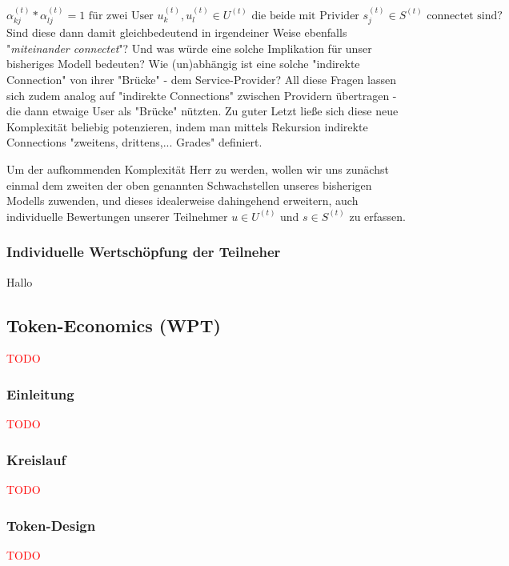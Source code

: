 \documentclass[11pt]{scrartcl}
\newcommand\todo[1]{\textcolor{red}{#1}}
\begin{document}
\begin{equation*}
  \alpha^{(t)}_{kj} * \alpha^{(t)}_{lj} = 1 \textrm{ für zwei User } u^{(t)}_k, u^{(t)}_l \in U^{(t)} \textrm{ die beide mit Privider } s^{(t)}_j \in S^{(t)} \textrm{ connectet sind?}
\end{equation*}
Sind diese dann damit gleichbedeutend in irgendeiner Weise ebenfalls "\textit{miteinander connectet}"? Und was würde eine solche Implikation für unser bisheriges Modell bedeuten? Wie (un)abhängig ist eine solche "indirekte Connection" von ihrer "Brücke" - dem Service-Provider? All diese Fragen lassen sich zudem analog auf "indirekte Connections" zwischen Providern übertragen - die dann etwaige User als "Brücke" nützten. Zu guter Letzt ließe sich diese neue Komplexität beliebig potenzieren, indem man mittels Rekursion indirekte Connections "zweitens, drittens,... Grades" definiert.

Um der aufkommenden Komplexität Herr zu werden, wollen wir uns zunächst einmal dem zweiten der oben genannten Schwachstellen unseres bisherigen Modells zuwenden, und dieses idealerweise dahingehend erweitern, auch individuelle Bewertungen unserer Teilnehmer $u \in U^{(t)}$ und $s \in S^{(t)}$ zu erfassen.


\subsubsection{Individuelle Wertschöpfung der Teilneher}
\label{sec:eco_zahlen_teilnehmer}

Hallo




\subsection{Token-Economics (WPT)}
\label{sec:eco_wpt}
\todo{TODO}

\subsubsection{Einleitung}
\label{sec:wpt_einleitung}
\todo{TODO}

\subsubsection{Kreislauf}
\label{sec:wpt_kreislauf}
\todo{TODO}

\subsubsection{Token-Design}
\label{sec:wpt_design}
\todo{TODO}
\end{document}
